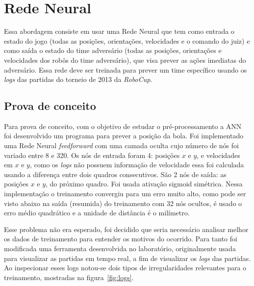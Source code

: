 \section{Rede Neural}\label{cap:abordagem_rede_neural}

Essa abordagem consiste em usar uma Rede Neural que tem como entrada o estado do
jogo (todas as posições, orientações, velocidades e o comando do juiz) e como
saída o estado do time adversário (todas as posições, orientações e velocidades
dos robôs do time adversário), que visa prever as ações imediatas do adversário.
Essa rede deve ser treinada para prever um time específico usando os
\textit{logs} das partidas do torneio de 2013 da \textit{RoboCup}.

\subsection{Prova de conceito}


Para prova de conceito, com o objetivo de estudar o pré-processamento
a ANN foi desenvolvido um programa para prever a
posição da bola. Foi implementado uma Rede Neural \textit{feedforward} com uma
camada oculta cujo
número de nós foi variado entre 8 e 320. Os nós de entrada foram 4: posições $x$
e $y$, e velocidades em $x$ e $y$, como os \textit{logs} não possuem informação
de velocidade essa foi calculada usando a diferença entre dois quadros
consecutivos. São 2 nós de saída: as posições $x$ e $y$, do próximo quadro. Foi
usada ativação sigmoid simétrica. Nessa implementação o treinamento convergiu
para um erro muito alto, como pode ser visto abaixo na saída (resumida) do
treinamento com 32 nós ocultos, é usado o erro médio quadrático e a unidade de
distância é o milímetro.



Esse problema não era esperado, foi decidido que seria necessário analisar
melhor os dados de treinamento para entender os motivos do ocorrido. Para tanto
foi modificada uma ferramenta desenvolvida no laboratório, originalmente usada
para visualizar as partidas em tempo real, a fim de visualizar os \textit{logs}
das partidas. Ao inspecionar esses logs notou-se dois tipos de irregularidades
relevantes para o treinamento, mostradas na figura~\ref{fig:logs}.


